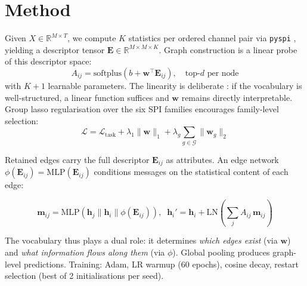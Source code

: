 \documentclass{article}
\begin{document}
\section{Method}
\label{sec:method}

Given $X \in \mathbb{R}^{M \times T}$, we compute $K$ statistics per ordered channel pair via \texttt{pyspi} \citep{cliff2023}, yielding a descriptor tensor $\mathbf{E} \in \mathbb{R}^{M \times M \times K}$. Graph construction is a linear probe of this descriptor space:
%
\begin{equation}
\label{eq:adj}
A_{ij} = \mathrm{softplus}\!\left(b + \mathbf{w}^\top \mathbf{E}_{ij}\right), \quad \text{top-}d \text{ per node}
\end{equation}
%
with $K {+} 1$ learnable parameters. The linearity is deliberate \citep[cf.][]{alain2017}: if the vocabulary is well-structured, a linear function suffices and $\mathbf{w}$ remains directly interpretable. Group lasso regularisation \citep{yuan2006} over the six SPI families encourages family-level selection:
%
\begin{equation}
\label{eq:loss}
\mathcal{L} = \mathcal{L}_{\mathrm{task}} + \lambda_1 \|\mathbf{w}\|_1 + \lambda_g \sum_{g \in \mathcal{G}} \|\mathbf{w}_g\|_2
\end{equation}

Retained edges carry the full descriptor $\mathbf{E}_{ij}$ as attributes. An edge network $\phi(\mathbf{E}_{ij}) {=} \mathrm{MLP}(\mathbf{E}_{ij})$ conditions messages on the statistical content of each edge:
%
\begin{footnotesize}
\begin{equation}
\mathbf{m}_{ij} {=} \mathrm{MLP}\!\left(\mathbf{h}_j \| \mathbf{h}_i \| \phi(\mathbf{E}_{ij})\right)\!, \;\; \mathbf{h}_i' {=} \mathbf{h}_i {+} \mathrm{LN}\!\left(\textstyle\sum_j A_{ij}\,\mathbf{m}_{ij}\right)
\end{equation}
\end{footnotesize}
%
The vocabulary thus plays a dual role: it determines \emph{which edges exist} (via $\mathbf{w}$) and \emph{what information flows along them} (via $\phi$). Global pooling produces graph-level predictions. Training: Adam, LR warmup (60 epochs), cosine decay, restart selection (best of 2 initialisations per seed).

\end{document}
